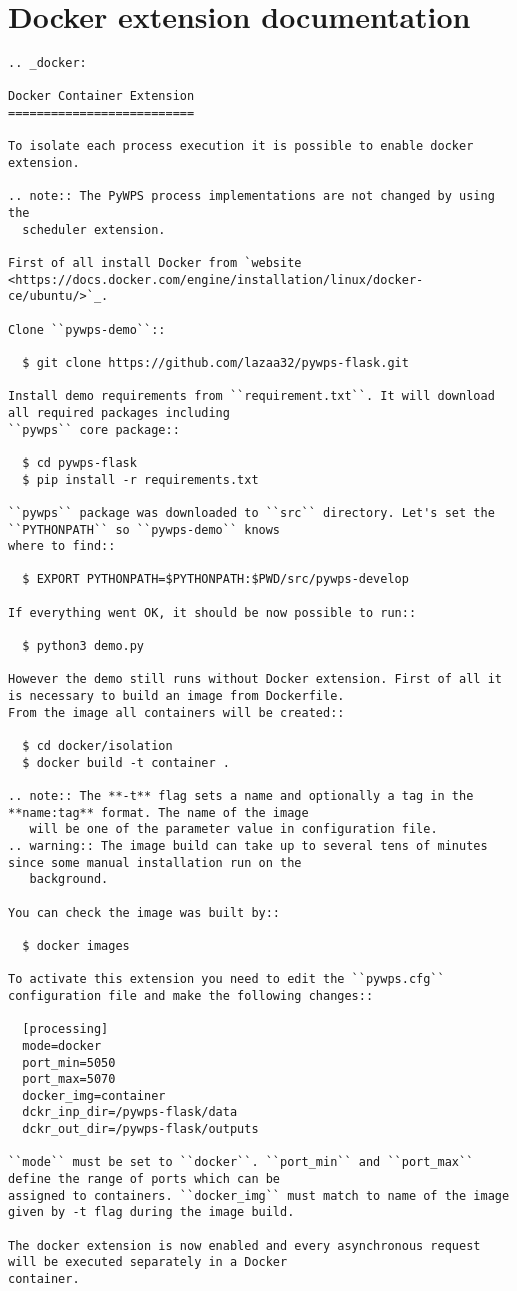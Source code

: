 \section{Docker extension documentation}
\label{app:docker_ext_docs}
\begin{lstlisting}[basicstyle=\small,caption={Docker extension documentation}]
.. _docker:

Docker Container Extension
==========================

To isolate each process execution it is possible to enable docker extension.

.. note:: The PyWPS process implementations are not changed by using the
  scheduler extension.

First of all install Docker from `website <https://docs.docker.com/engine/installation/linux/docker-ce/ubuntu/>`_.

Clone ``pywps-demo``::

  $ git clone https://github.com/lazaa32/pywps-flask.git

Install demo requirements from ``requirement.txt``. It will download all required packages including
``pywps`` core package::

  $ cd pywps-flask
  $ pip install -r requirements.txt

``pywps`` package was downloaded to ``src`` directory. Let's set the ``PYTHONPATH`` so ``pywps-demo`` knows
where to find::

  $ EXPORT PYTHONPATH=$PYTHONPATH:$PWD/src/pywps-develop

If everything went OK, it should be now possible to run::

  $ python3 demo.py

However the demo still runs without Docker extension. First of all it is necessary to build an image from Dockerfile.
From the image all containers will be created::

  $ cd docker/isolation
  $ docker build -t container .

.. note:: The **-t** flag sets a name and optionally a tag in the **name:tag** format. The name of the image
   will be one of the parameter value in configuration file.
.. warning:: The image build can take up to several tens of minutes since some manual installation run on the
   background.

You can check the image was built by::

  $ docker images

To activate this extension you need to edit the ``pywps.cfg`` configuration file and make the following changes::

  [processing]
  mode=docker
  port_min=5050
  port_max=5070
  docker_img=container
  dckr_inp_dir=/pywps-flask/data
  dckr_out_dir=/pywps-flask/outputs

``mode`` must be set to ``docker``. ``port_min`` and ``port_max`` define the range of ports which can be
assigned to containers. ``docker_img`` must match to name of the image given by -t flag during the image build.

The docker extension is now enabled and every asynchronous request will be executed separately in a Docker
container.
\end{lstlisting}

